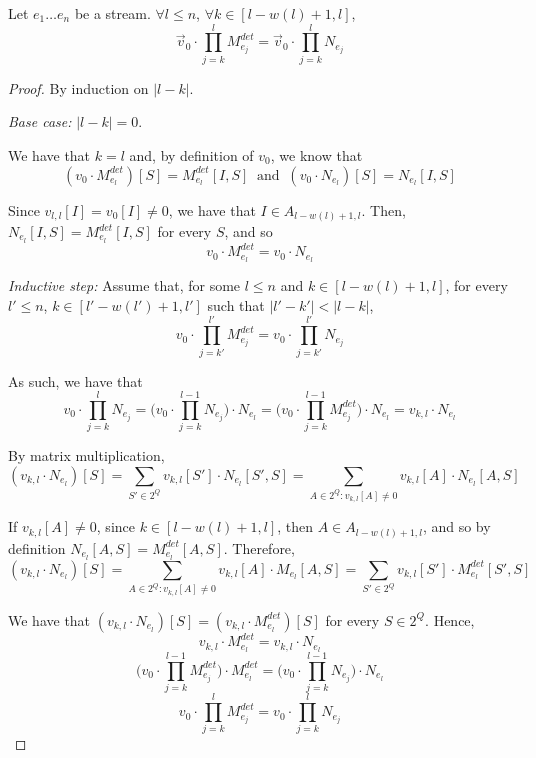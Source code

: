 \begin{lemma}\label{lemma:m_n_equivalence}
Let $e_1\dots e_n$ be a stream.
    $\forall l\leq n$, $\forall k\in[l-w(l)+1, l]$,
    $$ \vec{v}_{0}\cdot \prod_{j=k}^{l} M_{e_j}^{det} = \vec{v}_{0} \cdot \prod_{j=k}^{l} N_{e_j} $$
\end{lemma}

\begin{proof}

By induction on $|l-k|$.

\noindent\emph{Base case:} $|l-k| = 0$.

We have that $k = l$ and, by definition of ${v_0}$, we know that
$$({v_0}\cdot M_{e_l}^{det})[S] = M_{e_l}^{det}[I, S] \ \text{ and }\ ({v_0}\cdot N_{e_l})[S] = N_{e_l}[I, S]$$

Since $v_{l,l}[I] = {v_0}[I] \neq 0$, we have that $I \in A_{l-w(l)+1,l}$. 
Then, $N_{e_l}[I,S] = M_{e_l}^{det}[I,S]$ for every $S$, and so 
$${v_0}\cdot M_{e_l}^{det} = {v_0}\cdot N_{e_l}$$

\noindent\emph{Inductive step:} 
Assume that, for some $l\leq n$ and $k\in[l-w(l)+1,l]$, for every $l'\leq n$, $k\in[l'-w(l')+1,l']$ such that $|l'-k'|<|l-k|$, 
$$v_0\cdot \prod_{j=k'}^{l'} M_{e_j}^{det} = v_0\cdot \prod_{j=k'}^{l'} N_{e_j} $$

As such, we have that
$$ v_0\cdot \prod_{j=k}^{l} N_{e_j} = \big( v_0\cdot  \prod_{j=k}^{l-1} N_{e_j}\big) \cdot N_{e_l} = \big( v_0\cdot  \prod_{j=k}^{l-1} M_{e_j}^{det}\big) \cdot N_{e_l} = v_{k,l} \cdot N_{e_l} $$

By matrix multiplication,
$$(v_{k,l}\cdot N_{e_l})[S] = \sum_{S'\in 2^{Q}} v_{k,l}[S']\cdot N_{e_l}[S', S] =  \sum_{A\in 2^{Q}:v_{k,l}[A]\neq 0} v_{k,l}[A]\cdot N_{e_l}[A, S]$$


If $v_{k,l}[A]\neq 0$, since $k\in[l-w(l)+1,l]$, then $A\in A_{l-w(l)+1,l}$, and so by definition $N_{e_l}[A, S] = M_{e_l}^{det}[A,S]$. Therefore,
$$(v_{k,l}\cdot N_{e_l})[S] = \sum_{A\in 2^{Q}:v_{k,l}[A]\neq 0} v_{k,l}[A]\cdot M_{e_l}[A, S] = \sum_{S'\in 2^{Q}} v_{k,l}[S']\cdot M_{e_l}^{det}[S', S]$$

We have that $(v_{k,l}\cdot N_{e_l})[S] = (v_{k,l}\cdot M_{e_l}^{det})[S]$ for every $S\in 2^Q$. Hence,
$$v_{k,l}\cdot M_{e_l}^{det} = v_{k,l}\cdot N_{e_l}$$
$$\big( v_0\cdot  \prod_{j=k}^{l-1} M_{e_j}^{det}\big)\cdot M_{e_l}^{det} = \big( v_0\cdot  \prod_{j=k}^{l-1} N_{e_j}\big)\cdot N_{e_l}$$
$$v_0\cdot \prod_{j=k}^{l} M_{e_j}^{det} = v_0\cdot \prod_{j=k}^{l} N_{e_j} $$
\end{proof}

